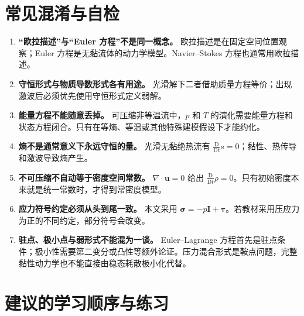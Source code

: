 \documentclass[cn,hazy,blue,11pt,normal]{elegantnote}
\numberwithin{equation}{section}
\newcommand{\Dt}{\frac{\mathrm D}{\mathrm Dt}}
\newcommand{\vct}[1]{\bm{#1}}
\newcommand{\ten}[1]{\bm{#1}}
\begin{document}
\section{常见混淆与自检}

\begin{enumerate}
 \item \textbf{“欧拉描述”与“Euler 方程”不是同一概念。}
 欧拉描述是在固定空间位置观察；Euler 方程是无黏流体的动力学模型。Navier--Stokes 方程也通常用欧拉描述。

 \item \textbf{守恒形式与物质导数形式各有用途。}
 光滑解下二者借助质量方程等价；出现激波后必须优先使用守恒形式定义弱解。

 \item \textbf{能量方程不能随意丢掉。}
 可压缩非等温流中，$p$ 和 $T$ 的演化需要能量方程和状态方程闭合。只有在等熵、等温或其他特殊建模假设下才能约化。

 \item \textbf{熵不是通常意义下永远守恒的量。}
 光滑无黏绝热流有 $\Dt s=0$；黏性、热传导和激波导致熵产生。

 \item \textbf{不可压缩不自动等于密度空间常数。}
 $\nabla\cdot\vct u=0$ 给出 $\Dt\rho=0$。只有初始密度本来就是统一常数时，才得到常密度模型。

 \item \textbf{应力符号约定必须从头到尾一致。}
 本文采用 $\ten\sigma=-p\ten I+\ten\tau$。若教材采用压应力为正的不同约定，部分符号会改变。

 \item \textbf{驻点、极小点与弱形式不能混为一谈。}
 Euler--Lagrange 方程首先是驻点条件；极小性需要第二变分或凸性等额外论证。压力混合形式是鞍点问题，完整黏性动力学也不能直接由稳态耗散极小化代替。
\end{enumerate}

\clearpage
\section{建议的学习顺序与练习}
\end{document}
